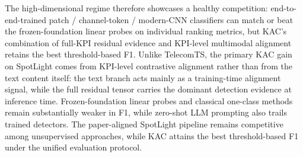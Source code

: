 \documentclass[conference]{IEEEtran}
\begin{document}
The high-dimensional regime therefore showcases a healthy competition: end-to-end-trained patch / channel-token / modern-CNN classifiers can match or beat the frozen-foundation linear probes on individual ranking metrics, but KAC's combination of full-KPI residual evidence and KPI-level multimodal alignment retains the best threshold-based F1. Unlike TelecomTS, the primary KAC gain on SpotLight comes from KPI-level contrastive alignment rather than from the text content itself: the text branch acts mainly as a training-time alignment signal, while the full residual tensor carries the dominant detection evidence at inference time. Frozen-foundation linear probes and classical one-class methods remain substantially weaker in F1, while zero-shot LLM prompting also trails trained detectors. The paper-aligned SpotLight pipeline remains competitive among unsupervised approaches, while KAC attains the best threshold-based F1 under the unified evaluation protocol.
\end{document}
